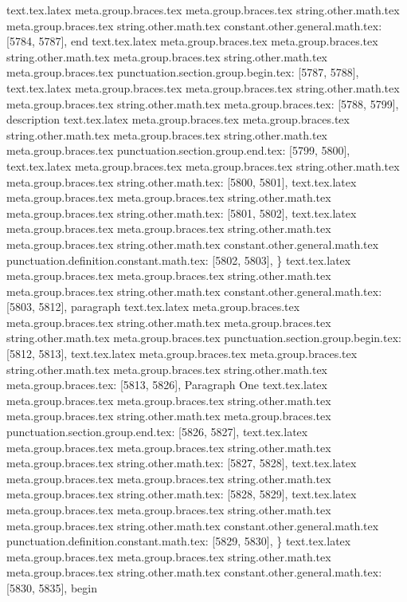 {{{{{{{{{{{{{{{{{{{{{{{{{{{{{{{{{{{{{{{{{{{{{{{{{{{{{{{{{{{{{{{{{{{{{{{{{{{{{{{{{{{{{{{{{{{{{{{{{{{{{{{{{{{{{{{{{{{{{{{{{{{{{{{{{{{{{{{{{{{{{{{{{{{{{{{{{{{{{{{{text.tex.latex meta.group.braces.tex meta.group.braces.tex string.other.math.tex meta.group.braces.tex string.other.math.tex constant.other.general.math.tex: [5784, 5787], {end}
text.tex.latex meta.group.braces.tex meta.group.braces.tex string.other.math.tex meta.group.braces.tex string.other.math.tex meta.group.braces.tex punctuation.section.group.begin.tex: [5787, 5788], {{}
text.tex.latex meta.group.braces.tex meta.group.braces.tex string.other.math.tex meta.group.braces.tex string.other.math.tex meta.group.braces.tex: [5788, 5799], {description}
text.tex.latex meta.group.braces.tex meta.group.braces.tex string.other.math.tex meta.group.braces.tex string.other.math.tex meta.group.braces.tex punctuation.section.group.end.tex: [5799, 5800], {}}
text.tex.latex meta.group.braces.tex meta.group.braces.tex string.other.math.tex meta.group.braces.tex string.other.math.tex: [5800, 5801], {
}
text.tex.latex meta.group.braces.tex meta.group.braces.tex string.other.math.tex meta.group.braces.tex string.other.math.tex: [5801, 5802], {
}
text.tex.latex meta.group.braces.tex meta.group.braces.tex string.other.math.tex meta.group.braces.tex string.other.math.tex constant.other.general.math.tex punctuation.definition.constant.math.tex: [5802, 5803], {\}
text.tex.latex meta.group.braces.tex meta.group.braces.tex string.other.math.tex meta.group.braces.tex string.other.math.tex constant.other.general.math.tex: [5803, 5812], {paragraph}
text.tex.latex meta.group.braces.tex meta.group.braces.tex string.other.math.tex meta.group.braces.tex string.other.math.tex meta.group.braces.tex punctuation.section.group.begin.tex: [5812, 5813], {{}
text.tex.latex meta.group.braces.tex meta.group.braces.tex string.other.math.tex meta.group.braces.tex string.other.math.tex meta.group.braces.tex: [5813, 5826], {Paragraph One}
text.tex.latex meta.group.braces.tex meta.group.braces.tex string.other.math.tex meta.group.braces.tex string.other.math.tex meta.group.braces.tex punctuation.section.group.end.tex: [5826, 5827], {}}
text.tex.latex meta.group.braces.tex meta.group.braces.tex string.other.math.tex meta.group.braces.tex string.other.math.tex: [5827, 5828], {
}
text.tex.latex meta.group.braces.tex meta.group.braces.tex string.other.math.tex meta.group.braces.tex string.other.math.tex: [5828, 5829], {
}
text.tex.latex meta.group.braces.tex meta.group.braces.tex string.other.math.tex meta.group.braces.tex string.other.math.tex constant.other.general.math.tex punctuation.definition.constant.math.tex: [5829, 5830], {\}
text.tex.latex meta.group.braces.tex meta.group.braces.tex string.other.math.tex meta.group.braces.tex string.other.math.tex constant.other.general.math.tex: [5830, 5835], {begin}
}}}}}}}}}}}}}}}}}}}}}}}}}}}}}}}}}}}}}}}}}}}}}}}}}}}}}}}}}}}}}}}}}}}}}}}}}}}}}}}}}}}}}}}}}}}}}}}}}}}}}}}}}}}}}}}}}}}}}}}}}}}}}}}}}}}}}}}}}}}}}}}}}}}}}}}}}}}}}}}}}}

